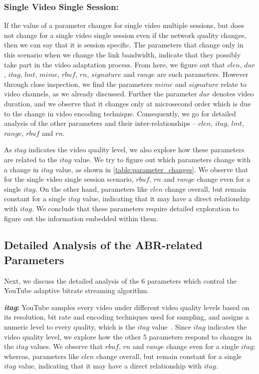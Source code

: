 \subsubsection{Single Video Single Session:} If the value of a parameter changes for single video multiple sessions, but does not change for a single video single session even if the network quality changes, then we can say that it is session specific. The parameters that change only in this scenario when we change the link bandwidth, indicate that they possibly take part in the video adaptation process. From here, we figure out that $clen$, $dur$, $itag$, $lmt$, $mime$, $rbuf$, $rn$, $signature$ and $range$ are such parameters. However through close inspection, we find the parameters $mime$ and $signature$ relate to video channels, as we already discussed. Further the parameter $dur$ denotes video duration, and we observe that it changes only at microsecond order which is due to the change in video encoding technique. Consequently, we go for detailed analysis of the other parameters and their inter-relationships -- $clen$, $itag$, $lmt$, $range$, $rbuf$ and $rn$. 

As $itag$ indicates the video quality level, we also explore how these parameters are related to the $itag$ value. We try to figure out which parameters change with a change in $itag$ value, as shown in \tbl\ref{table:parameter_changes}. We observe that for the single video single session scenario, $rbuf$, $rn$ and $range$ change even for a single $itag$. On the other hand, parameters like $clen$ change overall, but remain constant for a single $itag$ value, indicating that it may have a direct relationship with $itag$. We conclude that these parameters require detailed exploration to figure out the information embedded within them. 

\subsection{Detailed Analysis of the ABR-related Parameters}
Next, we discuss the detailed analysis of the $6$ parameters which control the YouTube adaptive bitrate streaming algorithm. 

{\bf {\em itag}:} YouTube samples every video under different video quality levels based on its resolution, bit rate and encoding techniques used for sampling, and assigns a numeric level to every quality, which is the $itag$ value~\cite{itag}.
Since $itag$ indicates the video quality level, we explore how the other 5 parameters respond to changes in the $itag$ values.
We observe that $rbuf$, $rn$ and $range$ change even for a single $itag$; whereas, parameters like $clen$ change overall, but remain constant for a single $itag$ value, indicating that it may have a direct relationship with $itag$. 

